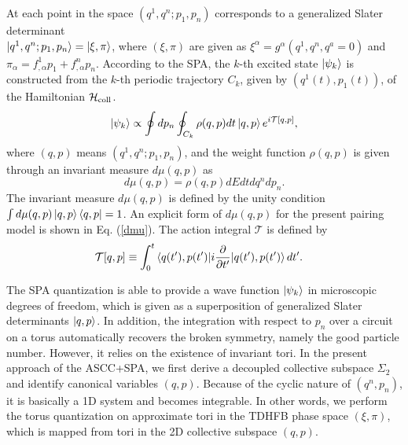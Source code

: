 \documentclass[11pt]{book} %
\begin{document}
At each point in the space $(q^1,q^n; p_1,p_n)$ corresponds to
a generalized Slater determinant \\
$\ket{q^1,q^n;p_1,p_n}=\ket{\xi,\pi}$, 
where $(\xi,\pi)$ are given as
$\xi^\alpha=g^\alpha(q^1,q^n,q^a=0)$ and
$\pi_\alpha=f^1_{,\alpha}p_1+f^n_{,\alpha}p_n$.
According to the SPA, the $k$-th excited state $\ket{\psi_k}$
is constructed from the $k$-th periodic trajectory $C_k$,
given by $(q^1(t),p_1(t))$,
of the Hamiltonian $\mathcal{H}_{\rm coll}$.
\begin{equation}
\ket{\psi_k} \propto \oint dp_n \oint_{C_k} \rho(q,p) dt \ket{q,p}
	e^{i\mathcal{T}[q,p]} ,
	\label{SPA}
\end{equation}
where $(q,p)$ means $(q^1,q^n;p_1, p_n)$, and the weight function
$\rho(q,p)$ is given through an invariant measure $d\mu(q,p)$ as
\begin{equation}
d\mu(q,p)=\rho(q,p) dE dt dq^n dp_n .
\end{equation}
The invariant measure $d\mu(q,p)$ is defined by the unity condition
$\int d\mu(q,p) \ket{q,p}\bra{q,p} = 1$.
An explicit form of $d\mu(q,p)$ for the present pairing model is shown
in Eq. (\ref{dmu}).
The action integral $\mathcal{T}$ is defined by
\begin{align}
\mathcal{T}[q,p] &\equiv
\int_{0}^{t} \braket{q(t'),p(t')| i\frac{\partial}{\partial t'}
	|q(t'),p(t')} dt' .
\label{tau}
\end{align}

The SPA quantization is able to provide a wave function $\ket{\psi_k}$
in microscopic degrees of freedom, which is given as a superposition
of generalized Slater determinants $\ket{q,p}$.
In addition, the integration with respect to $p_n$ over a circuit on a torus
automatically recovers the broken symmetry, namely the good particle number.
However, it relies on the existence of invariant tori.
In the present approach of the ASCC+SPA,
we first derive a decoupled collective subspace $\Sigma_2$ and identify
canonical variables $(q,p)$.
Because of the cyclic nature of $(q^n,p_n)$, it is basically a 1D system
and becomes integrable.
In other words, we perform the torus quantization on
approximate tori in the TDHFB phase space $(\xi,\pi)$,
which is mapped from tori in the 2D collective subspace $(q,p)$.



\end{document}
